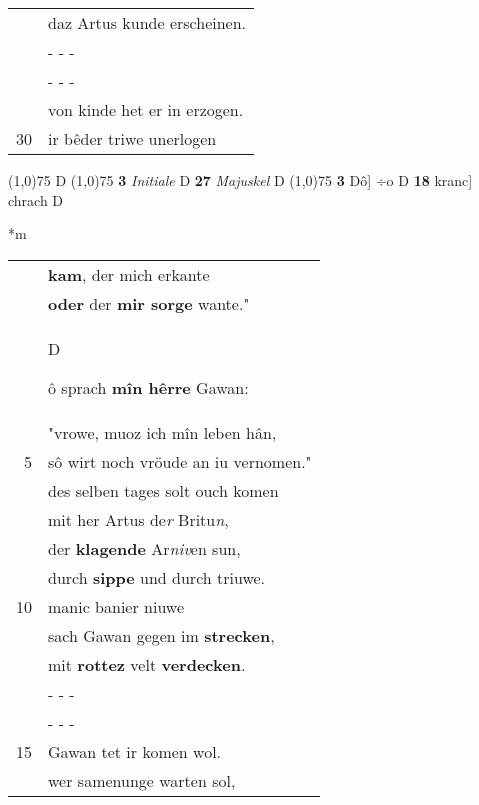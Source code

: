 \documentclass[8pt,a4paper,notitlepage]{article}
\begin{document}
\begin{table}[ht]
\begin{minipage}[t]{0.5\linewidth}
\begin{tabular}{rl}
 & daz Artus kunde erscheinen.\\ 
 & \multicolumn{1}{l}{ - - - }\\ 
 & \multicolumn{1}{l}{ - - - }\\ 
 & von kinde het er in erzogen.\\ 
30 & ir bêder triwe unerlogen\\ 
\end{tabular}
\scriptsize
\line(1,0){75} \newline
D \newline
\line(1,0){75} \newline
\textbf{3} \textit{Initiale} D  \textbf{27} \textit{Majuskel} D  \newline
\line(1,0){75} \newline
\textbf{3} Dô] ÷o D \textbf{18} kranc] chrach D \newline
\end{minipage}
\hspace{0.5cm}
\begin{minipage}[t]{0.5\linewidth}
\small
\begin{center}*m
\end{center}
\begin{tabular}{rl}
 & \textbf{kam}, der mich erkante\\ 
 & \textbf{oder} der \textbf{mir sorge} wante."\\ 
 & \begin{large}D\end{large}ô sprach \textbf{mîn hêrre} Gawan:\\ 
 & "vrowe, muoz ich mîn leben hân,\\ 
5 & sô wirt noch vröude an iu vernomen."\\ 
 & des selben tages solt ouch komen\\ 
 & mit her Artus de\textit{r} Britu\textit{n},\\ 
 & der \textbf{klagende} Ar\textit{niv}en sun,\\ 
 & durch \textbf{sippe} und durch triuwe.\\ 
10 & manic banier niuwe\\ 
 & sach Gawan gegen im \textbf{strecken},\\ 
 & mit \textbf{rotte}\textbf{z} velt \textbf{verdecken}.\\ 
 & \multicolumn{1}{l}{ - - - }\\ 
 & \multicolumn{1}{l}{ - - - }\\ 
15 & Gawan tet ir komen wol.\\ 
 & wer samenunge warten sol,\\ 

\end{tabular}
\end{minipage}
\end{table}
\end{document}
